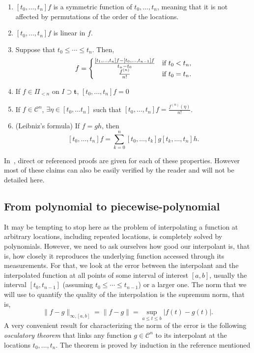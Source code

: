 \begin{prop}\label{prop:ddiff}
  \begin{enumerate}
    \item $[t_0, \ldots, t_n]f$ is a symmetric function of $t_0, \ldots, t_n$, meaning that it is not affected by 
      permutations of the order of the locations.
    \item $[t_0, \ldots, t_n]f$ is linear in $f$.
    \item Suppose that $t_0 \leq \cdots \leq t_n$. Then,
      \begin{equation*}
	[t_0, \ldots, t_n]f=
	\begin{cases}
	  \frac{[t_1, \ldots, t_n]f-[t_0, \ldots, t_{n-1}]f}{t_n-t_0} & \text{if} \ t_0 < t_n, \\
	  \hfil \frac{f^{(n)}}{n!} & \text{if} \ t_0 = t_n.
	\end{cases}
      \end{equation*}
    \item If $f \in \Pi_{<n}$ on $I \supset \bm{t}$, $[t_0, \ldots, t_n]f=0$
    \item If $f \in \mathcal{C}^n$, $\exists \eta \in [t_0, \ldots t_n]$ such that $[t_0, \ldots, 
      t_n]f=\frac{f^{(n)}(\eta)}{n!}$.
    \item (Leibniz's formula) If $f=gh$, then
      \begin{equation}
	\label{eq:Leibniz}
	[t_0, \ldots, t_n]f = \sum_{k=0}^n [t_0, \ldots, t_k]g [t_k, \ldots, t_n]h.
      \end{equation}
  \end{enumerate}
\end{prop}
In~\cite[Chapter I]{de_boor_practical_2001}, direct or referenced proofs are given for each of these properties. However 
most of these claims can also be easily verified by the reader and will not be detailed here.

\subsection{From polynomial to piecewise-polynomial}\label{ssec:poltopp}

It may be tempting to stop here as the problem of interpolating a function at arbitrary locations, including repeated 
locations, is completely solved by polynomials. However, we need to ask ourselves how good our interpolant is, that is, 
how closely it reproduces the underlying function accessed through its measurements. For that, we look at the error 
between the interpolant and the interpolated function at all points of some interval of interest $[a,b]$, usually the 
interval $[t_0, t_{n-1}]$ (assuming $t_0 \leq \cdots \leq t_{n-1}$) or a larger one. The norm that we will use to 
quantify the quality of the interpolation is the supremum norm, that is,
\begin{equation*}
  \|f-g\|_{\infty, [a,b]} = \|f-g\| = \sup_{a \leq t \leq b} |f(t)-g(t)|.
\end{equation*}
A very convenient result for characterizing the norm of the error is the following \emph{osculatory theorem} that links 
any function $g \in \mathcal{C}^n$ to its interpolant at the locations $t_0, \ldots, t_n$. The theorem is proved by 
induction in the reference mentioned

